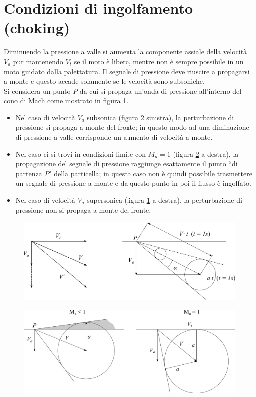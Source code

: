\section{Condizioni di ingolfamento (choking)}
Diminuendo la pressione a valle si aumenta la componente assiale della velocità $V_a$ pur mantenendo $V_t$ se il moto è libero, mentre non è sempre possibile in un moto guidato dalla palettatura. Il segnale di pressione deve riuscire a propagarsi a monte e questo accade solamente se le velocità sono subsoniche.\\
Si considera un punto $P$ da cui si propaga un'onda di pressione all'interno del cono di Mach come mostrato in figura \ref{fd:bloccson1}.
\begin{itemize}
	\item Nel caso di velocità $V_a$ subsonica (figura \ref{fd:bloccson2} sinistra), la perturbazione di pressione si propaga a monte del fronte; in questo modo ad una diminuzione di pressione a valle corrisponde un aumento di velocità a monte.
	\item Nel caso ci si trovi in condizioni limite con $M_a=1$ (figura \ref{fd:bloccson2} a destra), la propagazione del segnale di pressione raggiunge esattamente il punto ``di partenza $P$" della particella; in questo caso non è quindi possibile trasmettere un segnale di pressione a monte e da questo punto in poi il flusso è ingolfato.
	\item Nel caso di velocità $V_a$ supersonica (figura \ref{fd:bloccson1} a destra), la perturbazione di pressione non si propaga a monte del fronte.
\end{itemize} 
\begin{figure}[h!]
\centering
  \includegraphics[width=.8\textwidth]{fig/bloccson1.pdf}
\caption{}
\label{fd:bloccson1}
\end{figure}
\begin{figure}[h!]
\centering
  \includegraphics[width=.8\textwidth]{fig/bloccson2.pdf}
\caption{}
\label{fd:bloccson2}
\end{figure}
